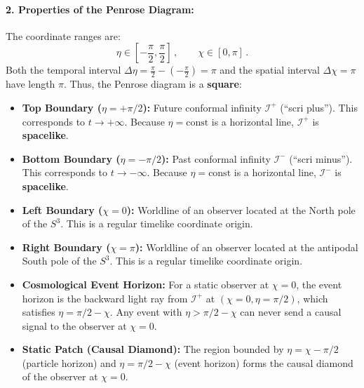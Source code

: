 \documentclass[12pt]{article}
\newcommand{\be}{\begin{equation}}
\newcommand{\ee}{\end{equation}}
\begin{document}
\paragraph{2. Properties of the Penrose Diagram:}
The coordinate ranges are:
\be
\eta \in \left[ -\frac{\pi}{2}, \frac{\pi}{2} \right] \,, \qquad \chi \in [0, \pi] \,.
\ee
Both the temporal interval $\Delta \eta = \frac{\pi}{2} - (-\frac{\pi}{2}) = \pi$ and the spatial interval $\Delta \chi = \pi$ have length $\pi$.
Thus, the Penrose diagram is a \textbf{square}:
\begin{itemize}
    \item \textbf{Top Boundary ($\eta = +\pi/2$):} Future conformal infinity $\mathcal{I}^+$ (``scri plus''). This corresponds to $t \to +\infty$. Because $\eta = \text{const}$ is a horizontal line, $\mathcal{I}^+$ is \textbf{spacelike}.
    \item \textbf{Bottom Boundary ($\eta = -\pi/2$):} Past conformal infinity $\mathcal{I}^-$ (``scri minus''). This corresponds to $t \to -\infty$. Because $\eta = \text{const}$ is a horizontal line, $\mathcal{I}^-$ is \textbf{spacelike}.
    \item \textbf{Left Boundary ($\chi = 0$):} Worldline of an observer located at the North pole of the $S^3$. This is a regular timelike coordinate origin.
    \item \textbf{Right Boundary ($\chi = \pi$):} Worldline of an observer located at the antipodal South pole of the $S^3$. This is a regular timelike coordinate origin.
    \item \textbf{Cosmological Event Horizon:} For a static observer at $\chi = 0$, the event horizon is the backward light ray from $\mathcal{I}^+$ at $(\chi = 0, \eta = \pi/2)$, which satisfies $\eta = \pi/2 - \chi$. Any event with $\eta > \pi/2 - \chi$ can never send a causal signal to the observer at $\chi = 0$.
    \item \textbf{Static Patch (Causal Diamond):} The region bounded by $\eta = \chi - \pi/2$ (particle horizon) and $\eta = \pi/2 - \chi$ (event horizon) forms the causal diamond of the observer at $\chi = 0$.
\end{itemize}
\end{document}
